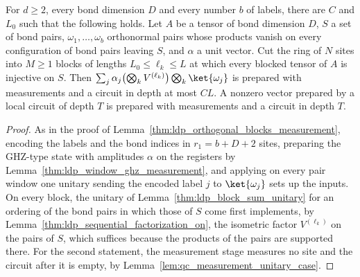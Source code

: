 \begin{lemma}
    \label{thm:ldp_injective_on_measurement}
    \leanok
    For $d\geq2$, every bond dimension $D$ and every number $b$ of labels, there
    are $C$ and $L_0$ such that the following holds. Let $A$ be a tensor of bond
    dimension $D$, $S$ a set of bond pairs, $\omega_1,\dots,\omega_b$
    orthonormal pairs whose products vanish on every configuration of bond pairs
    leaving $S$, and $\alpha$ a unit vector. Cut the ring of $N$ sites into
    $M\geq1$ blocks of lengths $L_0\leq\ell_k\leq L$ at which every blocked
    tensor of $A$ is injective on $S$. Then
    $\sum_j\alpha_j\bigl(\bigotimes_kV^{(\ell_k)}\bigr)\bigotimes_k\ket{\omega_j}$
    is prepared with measurements and a circuit in depth at most $CL$. A
    nonzero vector prepared by a local circuit of depth $T$ is prepared with
    measurements and a circuit in depth $T$.
\end{lemma}
\begin{proof}
    \leanok
    As in the proof of Lemma~\ref{thm:ldp_orthogonal_blocks_measurement},
    encoding the labels and the bond indices in $r_1=b+D+2$ sites, preparing the
    GHZ-type state with amplitudes $\alpha$ on the registers by
    Lemma~\ref{thm:ldp_window_ghz_measurement}, and applying on every pair window
    one unitary sending the encoded label $j$ to $\ket{\omega_j}$ sets up the
    inputs. On every block,
    the unitary of Lemma~\ref{thm:ldp_block_sum_unitary} for an ordering
    of the bond pairs in which those of $S$ come first implements, by
    Lemma~\ref{thm:ldp_sequential_factorization_on}, the
    isometric factor $V^{(\ell_k)}$ on the pairs of $S$, which suffices because
    the products of the pairs are supported there. For the second statement, the
    measurement stage measures no site and the circuit after it is empty, by
    Lemma~\ref{lem:qc_measurement_unitary_case}.
\end{proof}

